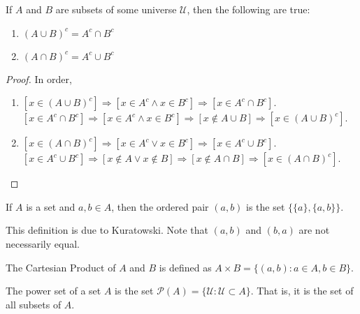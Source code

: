 \documentclass[crop=false,class=book]{standalone}
\begin{document}
\begin{theorem}
If $A$ and $B$ are subsets of some universe $\mathcal{U}$, then the following are true:
\begin{enumerate}
\item $(A\cup B)^c = A^c \cap B^c$
\item $(A\cap B)^c = A^c \cup B^c$
\end{enumerate}
\end{theorem}
\begin{proof}
In order,
\begin{enumerate}
\item $[x\in (A\cup B)^c]\Rightarrow [x\in A^c\land x\in B^c]\Rightarrow [x\in A^c\cap B^c]$. $[x\in A^c \cap B^c]\Rightarrow [x\in A^c\land x\in B^c]\Rightarrow [x\notin A\cup B]\Rightarrow [x\in (A\cup B)^c]$.
\item $[x\in (A\cap B)^c]\Rightarrow [x\in A^c\lor x\in B^c]\Rightarrow [x\in A^c \cup B^c]$. $[x\in A^c \cup B^c]\Rightarrow [x\notin A\lor x\notin B]\Rightarrow [x\notin A\cap B]\Rightarrow [x\in (A\cap B)^c]$.
\end{enumerate}
\end{proof}
\begin{definition}
If $A$ is a set and $a,b\in A$, then the ordered pair $(a,b)$ is the set $\{\{a\},\{a,b\}\}$.
\end{definition}
\begin{remark}
This definition is due to Kuratowski. Note that $(a,b)$ and $(b,a)$ are not necessarily equal.
\end{remark}
\begin{definition}
The Cartesian Product of $A$ and $B$ is defined as $A\times B = \{(a,b):a\in A, b\in B\}$.
\end{definition}
\begin{definition}
The power set of a set $A$ is the set $\mathcal{P}(A) = \{\mathcal{U}:\mathcal{U}\subset A\}$. That is, it is the set of all subsets of $A$.
\end{definition}
\end{document}
